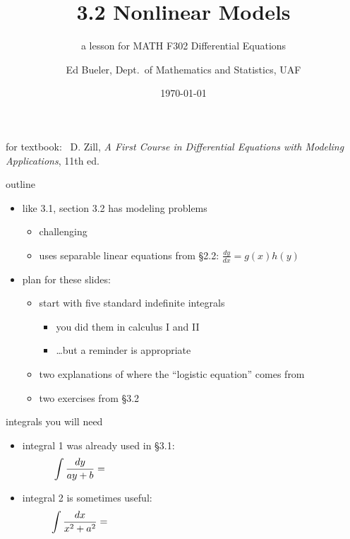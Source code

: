 \documentclass{beamer}
\title{3.2 Nonlinear Models}
\subtitle{a lesson for MATH F302 Differential Equations}
\author{Ed Bueler, Dept.~of Mathematics and Statistics, UAF}
\date{\tiny \today}
\begin{document}


\begin{frame}
\titlepage

\centerline{\tiny for textbook: \, D. Zill, \emph{A First Course in Differential Equations with Modeling Applications}, 11th ed.}
\end{frame}


\begin{frame}{outline}

\begin{itemize}
\item like 3.1, section 3.2 has modeling problems
    \begin{itemize}
    \item challenging
    \item uses separable linear equations from \S2.2: $\frac{dy}{dx} = g(x) h(y)$
    \end{itemize}
\item plan for these slides:
    \begin{itemize}
    \item start with five standard indefinite integrals
        \begin{itemize}
        \item you did them in calculus I and II
        \item \dots but a reminder is appropriate
        \end{itemize}
    \item two explanations of where the ``logistic equation'' comes from
    \item two exercises from \S3.2
    \end{itemize} 
\end{itemize}
\end{frame}


\begin{frame}{integrals you will need}

\begin{itemize}
\item {\color{blue} integral 1} was already used in \S3.1:
    $$\int \frac{dy}{ay+b} = \hspace{80mm}$$

\vspace{10mm}
\item {\color{blue} integral 2} is sometimes useful:
    $$\int \frac{dx}{x^2+a^2} = \hspace{80mm}$$

\vspace{25mm}
\end{itemize}
\end{frame}
\end{document}
